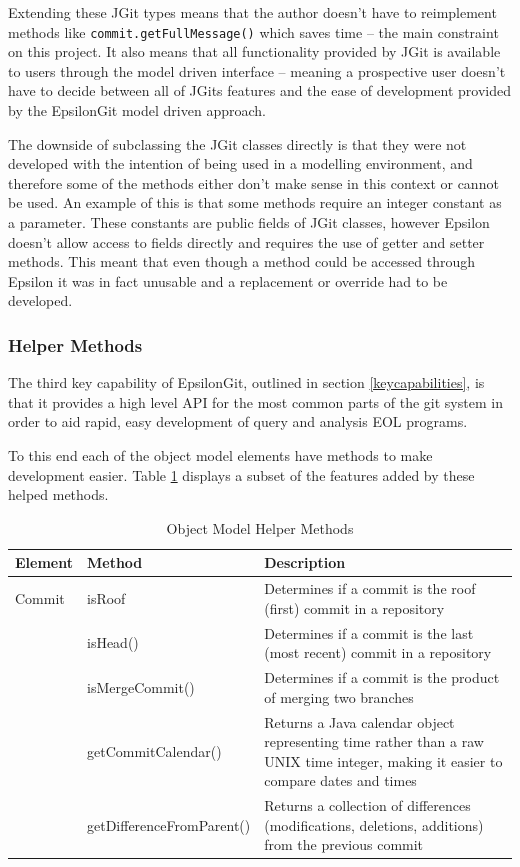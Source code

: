 \documentclass[11pt]{book}
\newcommand{\code}[1]{\texttt{#1}}
\begin{document}
Extending these JGit types means that the author doesn't have to reimplement methods like \code{commit.getFullMessage()} which saves time -- the main constraint on this project. It also means that all functionality provided by JGit is available to users through the model driven interface -- meaning a prospective user doesn't have to decide between all of JGits features and the ease of development provided by the EpsilonGit model driven approach.

The downside of subclassing the JGit classes directly is that they were not developed with the intention of being used in a modelling environment, and therefore some of the methods either don't make sense in this context or cannot be used. An example of this is that some methods require an integer constant as a parameter. These constants are public fields of JGit classes, however Epsilon doesn't allow access to fields directly and requires the use of getter and setter methods. This meant that even though a method could be accessed through Epsilon it was in fact unusable and a replacement or override had to be developed.

\subsubsection{Helper Methods}
The third key capability of EpsilonGit, outlined in section \ref{keycapabilities}, is that it provides a high level API for the most common parts of the git system in order to aid rapid, easy development of query and analysis EOL programs.

To this end each of the object model elements have methods to make development easier. Table \ref{tab:helpermethods} displays a subset of the features added by these helped methods.

\begin{table}[H]
\centering
\begin{longtable}{|p{2cm}|p{4.5cm}|p{8.5cm}|}
\hline
\textbf{Element} & \textbf{Method} & \textbf{Description}  \\ \hline
Commit & isRoof & Determines if a commit is the roof (first) commit in a repository \\
& isHead() & Determines if a commit is the last (most recent) commit in a repository \\
& isMergeCommit() & Determines if a commit is the product of merging two branches \\
& getCommitCalendar() & Returns a Java calendar object representing time rather than a raw UNIX time integer, making it easier to compare dates and times \\
& getDifferenceFromParent() & Returns a collection of differences (modifications, deletions, additions) from the previous commit \\ \hline
\end{longtable}
\caption{Object Model Helper Methods}
\label{tab:helpermethods}
\end{table}
\end{document}
